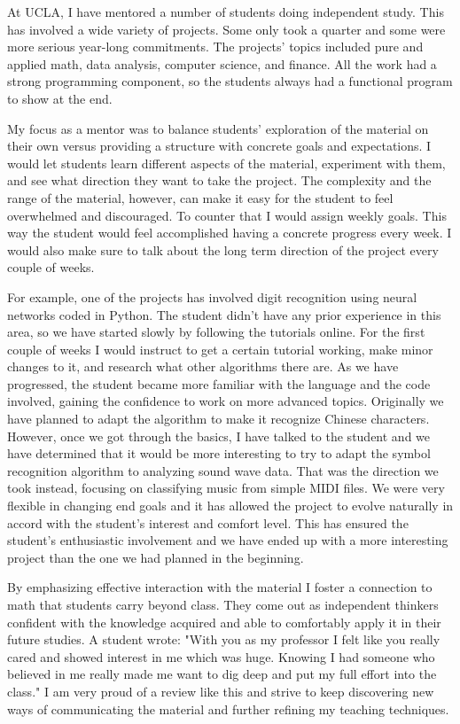 \documentclass[11pt]{article}
\begin{document}
At UCLA, I have mentored a number of students doing independent study.
This has involved a wide variety of projects.
Some only took a quarter and some were more serious year-long commitments.
The projects' topics included pure and applied math, data analysis, computer science, and finance.
All the work had a strong programming component, so the students always had a functional program to show at the end.

My focus as a mentor was to balance students' exploration of the material on their own versus providing a structure with concrete goals and expectations.
I would let students learn different aspects of the material, experiment with them, and see what direction they want to take the project.
The complexity and the range of the material, however, can make it easy for the student to feel overwhelmed and discouraged.
To counter that I would assign weekly goals.
This way the student would feel accomplished having a concrete progress every week.
I would also make sure to talk about the long term direction of the project every couple of weeks.

For example, one of the projects has involved digit recognition using neural networks coded in Python.
The student didn't have any prior experience in this area, so we have started slowly by following the tutorials online.
For the first couple of weeks I would instruct to get a certain tutorial working, make minor changes to it, and research what other algorithms there are.
As we have progressed, the student became more familiar with the language and the code involved, gaining the confidence to work on more advanced topics.
Originally we have planned to adapt the algorithm to make it recognize Chinese characters.
However, once we got through the basics, I have talked to the student and we have determined that it would be more interesting to try to adapt the symbol recognition algorithm to analyzing sound wave data.
That was the direction we took instead, focusing on classifying music from simple MIDI files.
We were very flexible in changing end goals and it has allowed the project to evolve naturally in accord with the student's interest and comfort level.
This has ensured the student's enthusiastic involvement and we have ended up with a more interesting project than the one we had planned in the beginning.

By emphasizing effective interaction with the material I foster a connection to math that students carry beyond class.
They come out as independent thinkers confident with the knowledge acquired and able to comfortably apply it in their future studies.
A student wrote: "With you as my professor I felt like you really cared and showed interest in me which was huge.
Knowing I had someone who believed in me really made me want to dig deep and put my full effort into the class."
I am very proud of a review like this and strive to keep discovering new ways of communicating the material and further refining my teaching techniques.
\end{document}
